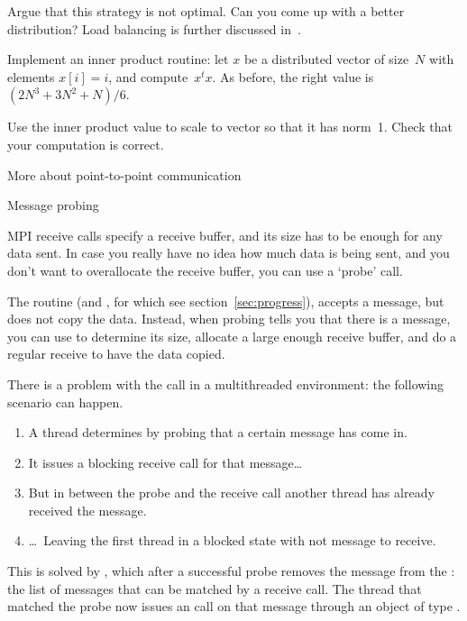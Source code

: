 \begin{exercise}
  Argue that this strategy is not optimal. Can you come up with a
  better distribution?
  Load balancing is further discussed in~.
\end{exercise}

\begin{exercise}
  \label{ex:inproduct}
  Implement an inner product routine: let $x$ be a
  distributed vector of size~$N$ with elements $x[i]=i$,
  and compute~$x^tx$.
  As before, the right value is $(2N^3+3N^2+N)/6$.

  Use the inner product value to scale to vector so that it has
  norm~1.
  Check that your computation is correct.
\end{exercise}





 {More about point-to-point communication}

 {Message probing}

MPI receive calls specify a receive buffer, and its size has to be
enough for any data sent. In case you really have no idea how much data
is being sent, and you don't want to overallocate the receive buffer,
you can use a `probe' call.

The routine  (and ,
for which see section~\ref{sec:progress}), accepts a message,
but does not copy the data. Instead, when probing tells you that there is a
message, you can use  to determine its size,
allocate a large enough receive buffer, and do a regular receive to
have the data copied.


There is a problem with the  call in a
multithreaded environment: the following scenario can happen.
\begin{enumerate}
\item A thread determines by probing that a certain message has come
  in.
\item It issues a blocking receive call for that message\dots
\item But in between the probe and the receive call another thread
  has already received the message.
\item \dots~Leaving the first thread in a blocked state with not
  message to receive.
\end{enumerate}
This is solved by , which after a successful
probe removes the message from the : the
list of messages that can be matched by a receive call. The thread
that matched the probe now issues an  call on
that message through an object of type .

